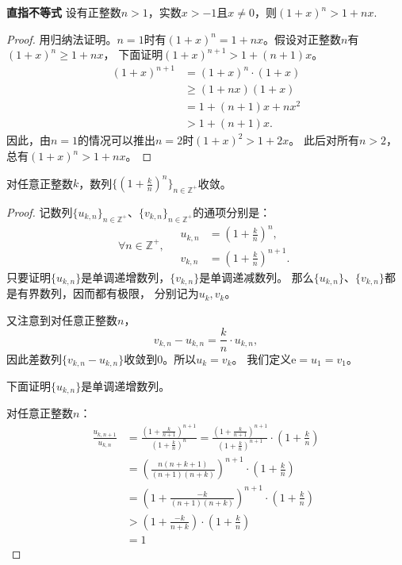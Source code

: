 \documentclass[12pt,UTF8]{ctexbook}
\begin{document}
\begin{appendix}
\begin{tm}{\textbf{直指不等式}}\label{tm:b-1-20}
    设有正整数$n > 1$，实数$x > -1$且$x \neq 0$，则$(1 + x)^n > 1 + nx.$
\end{tm}

\begin{proof}
    用归纳法证明。$n = 1$时有$(1 + x)^n = 1 + nx$。假设对正整数$n$有$(1 + x)^n \geqslant 1 + nx$，
    下面证明$(1 + x)^{n+1} > 1 + (n+1)x$。
    \begin{align*}
        (1 + x)^{n+1} &= (1 + x)^{n} \cdot (1 + x)  \\
        &\geqslant (1 + nx)(1 + x)  \\
        &= 1 + (n + 1)x + nx^2  \\
        &> 1 + (n + 1)x.
   \end{align*}
   因此，由$n=1$的情况可以推出$n=2$时$(1 + x)^{2} > 1 + 2x$。
   此后对所有$n>2$，总有$(1 + x)^{n} > 1 + nx$。
\end{proof}

\begin{tm}\label{tm:b-1-30}
    对任意正整数$k$，数列$\{\left(1 + \frac{k}{n}\right)^n\}_{n\in\mathbb{Z}^+}$收敛。
\end{tm}

\begin{proof}
    记数列$\{u_{k,n}\}_{n\in\mathbb{Z}^+}$、$\{v_{k,n}\}_{n\in\mathbb{Z}^+}$的通项分别是：
    $$
    \forall n \in\mathbb{Z}^+, \quad
    \begin{array}{cl}
        u_{k,n} &=  \left(1 + \frac{k}{n}\right)^n, \\
        v_{k,n} &= \left(1 + \frac{k}{n}\right)^{n+1}.
    \end{array}
    $$
    只要证明$\{u_{k,n}\}$是单调递增数列，$\{v_{k,n}\}$是单调递减数列。
    那么$\{u_{k,n}\}$、$\{v_{k,n}\}$都是有界数列，因而都有极限，
    分别记为$u_{k}, v_k$。

    又注意到对任意正整数$n$，
    $$v_{k,n} - u_{k,n} = \frac{k}{n} \cdot u_{k,n}, $$
    因此差数列$\{v_{k,n} - u_{k,n}\}$收敛到$0$。所以$u_k = v_k$。
    我们定义$\mathrm{e} = u_1 = v_1$。

    下面证明$\{u_{k,n}\}$是单调递增数列。

    对任意正整数$n$：
    \begin{align*}
        \frac{u_{k,n+1}}{u_{k,n}} &= \frac{\left(1 + \frac{k}{n+1}\right)^{n+1}}{\left(1 + \frac{k}{n}\right)^n} = \frac{\left(1 + \frac{k}{n+1}\right)^{n+1}}{\left(1 + \frac{k}{n}\right)^{n+1}} \cdot \left(1 + \frac{k}{n}\right)  \\
        &= \left(\frac{n(n+k+1)}{(n+1)(n+k)}\right)^{n+1} \cdot \left(1 + \frac{k}{n}\right)  \\
        &= \left(1 + \frac{-k}{(n+1)(n+k)}\right)^{n+1} \cdot \left(1 + \frac{k}{n}\right)  \\
        &> \left(1 + \frac{-k}{n+k}\right)\cdot \left(1 + \frac{k}{n}\right) \tag{直指不等式} \\
        &= 1  
    \end{align*}
    

\end{proof}
\end{appendix}
\end{document}
